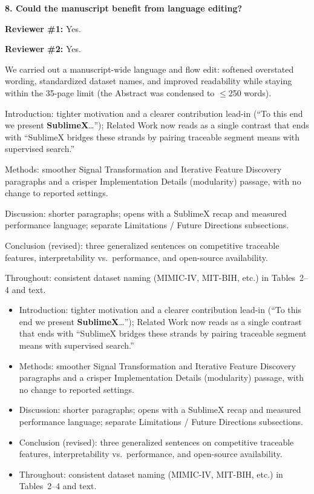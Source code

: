 \documentclass[11pt]{article}
\makeatletter
\newcommand{\rsp}{\par\vspace{0.9em}}
\newcommand{\rcbothq}[3]{%
  \begin{reviewerbox}\textbf{#1}\par\smallskip\textbf{Reviewer \#1:} #2\par\smallskip%
  \textbf{Reviewer \#2:} #3\end{reviewerbox}}
\newcommand{\response}[2]{%
  \begin{responsebox}#1%
  \def\@responseitems{#2}%
  \ifx\@responseitems\empty\else\begin{itemize}[nosep,leftmargin=1.2em]#2\end{itemize}\fi
  \end{responsebox}\rsp}
\makeatother
\begin{document}
\rcbothq{8. Could the manuscript benefit from language editing?}{Yes.}{Yes.}

\response{We carried out a manuscript-wide language and flow edit: softened overstated wording,
standardized dataset names, and improved readability while staying within the 35-page limit (the
Abstract was condensed to $\leq$250 words).}{
  \item Introduction: tighter motivation and a clearer contribution lead-in (``To this end we
    present \textbf{SublimeX}\ldots''); Related Work now reads as a single contrast that ends with
    ``SublimeX bridges these strands by pairing traceable segment means with supervised search.''
  \item Methods: smoother Signal Transformation and Iterative Feature Discovery paragraphs and a
    crisper Implementation Details (modularity) passage, with no change to reported settings.
  \item Discussion: shorter paragraphs; opens with a SublimeX recap and measured performance
    language; separate Limitations / Future Directions subsections.
  \item Conclusion (revised): three generalized sentences on competitive traceable features,
    interpretability vs.\ performance, and open-source availability.
  \item Throughout: consistent dataset naming (MIMIC-IV, MIT-BIH, etc.) in Tables~2--4 and text.
}
\end{document}
